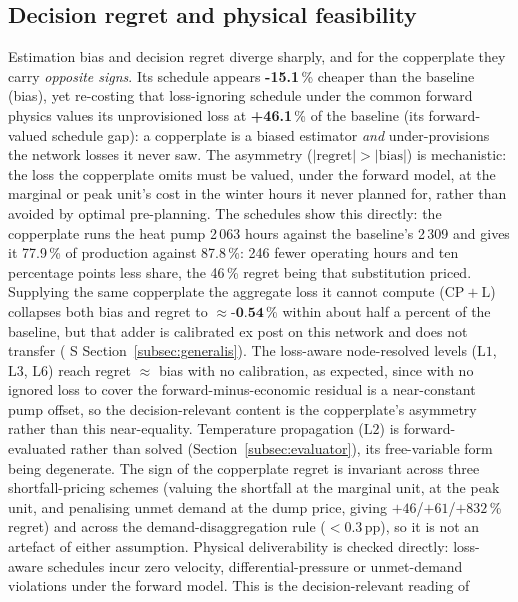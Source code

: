 \documentclass[a4paper,fleqn]{cas-sc}
\newcommand{\CPL}{\ensuremath{\mathrm{CP{+}L}}}
\newcommand{\Lone}{\ensuremath{\mathrm{L1}}}
\newcommand{\Ltwo}{\ensuremath{\mathrm{L2}}}
\newcommand{\Lthree}{\ensuremath{\mathrm{L3}}}
\newcommand{\Lsix}{\ensuremath{\mathrm{L6}}}
\providecommand{\DIFadd}[1]{{\protect\color[HTML]{1A5FB4} #1}} %
\providecommand{\DIFdel}[1]{{\protect\color[HTML]{9A9996} #1}} %
\providecommand{\DIFaddbegin}{} %
\providecommand{\DIFaddend}{} %
\providecommand{\DIFdelbegin}{} %
\providecommand{\DIFdelend}{} %
\newcommand{\DIFscaledelfig}{0.5}
\newlength{\DIFdelgraphicswidth} %
\newlength{\DIFdelgraphicsheight} %
\newcommand{\DIFaddincludegraphics}[2][]{{\color{blue}\fbox{\DIFOincludegraphics[#1]{#2}}}} %
\newcommand{\DIFdelincludegraphics}[2][]{%
\sbox{\DIFdelgraphicsbox}{\DIFOincludegraphics[#1]{#2}}%
\settoboxwidth{\DIFdelgraphicswidth}{\DIFdelgraphicsbox} %
\settoboxtotalheight{\DIFdelgraphicsheight}{\DIFdelgraphicsbox} %
\scalebox{\DIFscaledelfig}{%
\parbox[b]{\DIFdelgraphicswidth}{\usebox{\DIFdelgraphicsbox}\\[-\baselineskip] \rule{\DIFdelgraphicswidth}{0em}}\llap{\resizebox{\DIFdelgraphicswidth}{\DIFdelgraphicsheight}{%
\setlength{\unitlength}{\DIFdelgraphicswidth}%
\begin{picture}(1,1)%
\thicklines\linethickness{2pt} %
{\color[rgb]{1,0,0}\put(0,0){\framebox(1,1){}}}%
{\color[rgb]{1,0,0}\put(0,0){\line( 1,1){1}}}%
{\color[rgb]{1,0,0}\put(0,1){\line(1,-1){1}}}%
\end{picture}%
}\hspace*{3pt}}} %
} %
\DeclareRobustCommand{\DIFaddbegin}{\DIFOaddbegin \let\includegraphics\DIFaddincludegraphics} %
\DeclareRobustCommand{\DIFaddend}{\DIFOaddend \let\includegraphics\DIFOincludegraphics} %
\DeclareRobustCommand{\DIFdelbegin}{\DIFOdelbegin \let\includegraphics\DIFdelincludegraphics} %
\DeclareRobustCommand{\DIFdelend}{\DIFOaddend \let\includegraphics\DIFOincludegraphics} %
\begin{document}
\subsection{Decision regret and physical feasibility}
Estimation bias and decision regret diverge sharply, and for the copperplate they
carry \emph{opposite signs}. Its schedule appears \textbf{-15.1}\,\% cheaper
than the baseline (bias), yet re-costing that loss-ignoring schedule under the common
forward physics values its unprovisioned loss at \textbf{+46.1}\,\% of the baseline
(its forward-valued schedule gap): a copperplate is a biased estimator \emph{and}
under-provisions the network losses it never saw. The asymmetry
($|\text{regret}|>|\text{bias}|$) is mechanistic: the loss the copperplate omits must
be valued, under the forward model, at the marginal or peak unit's cost in the winter
hours it never planned for, rather than avoided by optimal pre-planning. The schedules show this directly: the copperplate runs the heat pump 2\,063 hours against the baseline's 2\,309 and gives it 77.9\,\% of production against 87.8\,\%: 246 fewer operating hours and ten percentage points less share, the 46\,\% regret being that substitution priced. Supplying the same
copperplate the aggregate loss it cannot compute (\CPL) collapses both bias and regret
to \DIFdelbegin \DIFdel{$\approx\textbf{-0.54}\,\%$}\DIFdelend{} \DIFaddbegin \DIFadd{within about half a percent of the baseline}\DIFaddend , but that adder is calibrated ex post on this
network and does not transfer (\DIFdelbegin \DIFdel{S}\DIFdelend{} \DIFaddbegin \DIFadd{Section~}\DIFaddend \ref{subsec:generalis}). The loss-aware node-resolved levels
(\Lone, \Lthree, \Lsix) reach regret $\approx$ bias with no calibration, as expected, since with
no ignored loss to cover the forward-minus-economic residual is a near-constant pump offset, so
the decision-relevant content is the copperplate's asymmetry rather than this near-equality.
Temperature propagation (\Ltwo) is forward-evaluated rather than solved (Section~\ref{subsec:evaluator}), its
free-variable form being degenerate. The sign of the
copperplate regret is invariant across three shortfall-pricing schemes (valuing the shortfall at
the marginal unit, at the peak unit, and penalising unmet demand at the dump price, giving
$+46$/$+61$/$+832$\,\% regret) and across the demand-disaggregation rule
($<0.3$\,pp), so it is not an artefact of either assumption. Physical deliverability is
checked directly: loss-aware schedules incur zero velocity, differential-pressure or
unmet-demand violations under the forward model. This is the decision-relevant reading of
\end{document}
